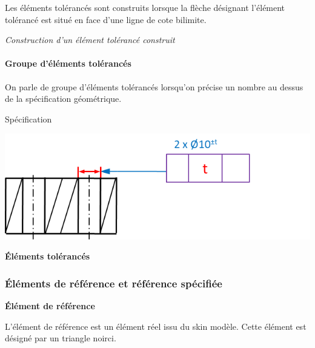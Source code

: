 \documentclass[11pt,oneside]{article}
\begin{document}
\begin{rem}
Les éléments tolérancés sont construits lorsque la flèche désignant l'élément tolérancé est situé en face d'une ligne de cote bilimite. 
\end{rem}


\begin{rem}
\textit{Construction d'un élément tolérancé construit}
\end{rem}
\paragraph*{Groupe d'éléments tolérancés}


\begin{exemple}

On parle de groupe d'éléments tolérancés lorsqu'on précise un nombre au dessus de la spécification géométrique.

\begin{minipage}[t]{.45\linewidth}
\begin{center}
Spécification

\includegraphics[width=.95\textwidth]{png/et_gr}
\end{center}
\end{minipage} \hfill
\begin{minipage}[t]{.45\linewidth}
\begin{center}
\textbf{Éléments tolérancés}
\end{center}


\end{minipage} 
\end{exemple}


\subsubsection{Éléments de référence et référence spécifiée}
\begin{defi}

\textbf{Élément de référence}

L'élément de référence est un élément réel issu du skin modèle. Cette élément est désigné par un triangle noirci.
\end{defi}
\end{document}
